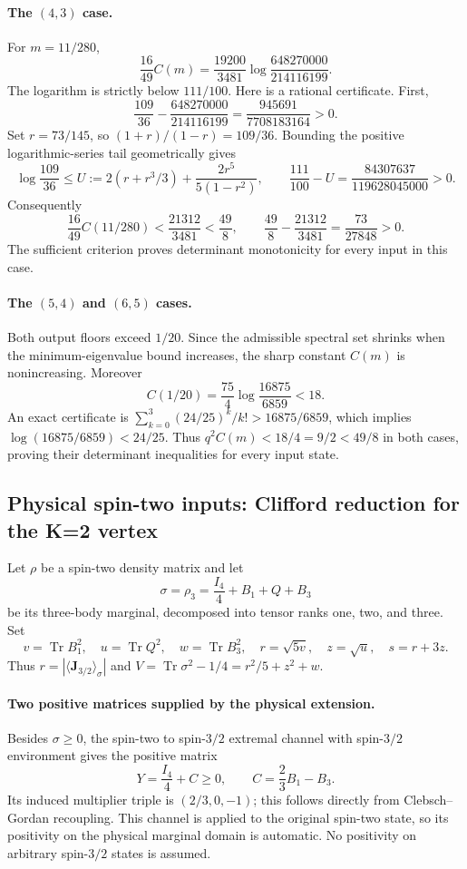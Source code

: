 \documentclass[11pt,a4paper]{article}
\begin{document}
\paragraph{The $(4,3)$ case.}
For $m=11/280$,
\[
 \frac{16}{49}C(m)
 =\frac{19200}{3481}
     \log\frac{648270000}{214116199}.
\]
The logarithm is strictly below $111/100$. Here is a rational
certificate. First,
\[
 \frac{109}{36}-\frac{648270000}{214116199}
 =\frac{945691}{7708183164}>0.
\]
Set $r=73/145$, so $(1+r)/(1-r)=109/36$.
Bounding the positive logarithmic-series tail geometrically gives
\[
 \log\frac{109}{36}
 \le U:=2(r+r^3/3)+\frac{2r^5}{5(1-r^2)},
 \qquad \frac{111}{100}-U
 =\frac{84307637}{119628045000}>0.
\]
Consequently
\[
 \frac{16}{49}C(11/280)
 <\frac{21312}{3481}<\frac{49}{8},\qquad
 \frac{49}{8}-\frac{21312}{3481}=\frac{73}{27848}>0.
\]
The sufficient criterion proves determinant monotonicity for every
input in this case.

\paragraph{The $(5,4)$ and $(6,5)$ cases.}
Both output floors exceed $1/20$. Since the admissible spectral
set shrinks when the minimum-eigenvalue bound increases, the sharp
constant $C(m)$ is nonincreasing. Moreover
\[
 C(1/20)=\frac{75}{4}\log\frac{16875}{6859}<18.
\]
An exact certificate is
$\sum_{k=0}^3(24/25)^k/k!>16875/6859$, which implies
$\log(16875/6859)<24/25$.
Thus $q^2C(m)<18/4=9/2<49/8$ in both cases, proving their
determinant inequalities for every input state.


\subsection{Physical spin-two inputs: Clifford reduction for the K=2 vertex}
Let $\rho$ be a spin-two density matrix and let
\[
 \sigma=\rho_3=\frac{I_4}{4}+B_1+Q+B_3
\]
be its three-body marginal, decomposed into tensor ranks one, two, and three.
Set
\[
 v=\operatorname{Tr}B_1^2,\quad u=\operatorname{Tr}Q^2,\quad
 w=\operatorname{Tr}B_3^2,\quad r=\sqrt{5v},\quad z=\sqrt u,
 \quad s=r+3z.
\]
Thus $r=|\langle\mathbf J_{3/2}\rangle_\sigma|$ and
$V=\operatorname{Tr}\sigma^2-1/4=r^2/5+z^2+w$.

\paragraph{Two positive matrices supplied by the physical extension.}
Besides $\sigma\ge0$, the spin-two to spin-$3/2$ extremal channel with
spin-$3/2$ environment gives the positive matrix
\[
 Y=\frac{I_4}{4}+C\ge0,\qquad C=\frac23B_1-B_3.
\]
Its induced multiplier triple is $(2/3,0,-1)$; this follows directly from
Clebsch--Gordan recoupling. This channel is applied to the original spin-two
state, so its positivity on the physical marginal domain is automatic.
No positivity on arbitrary spin-$3/2$ states is assumed.
\end{document}
